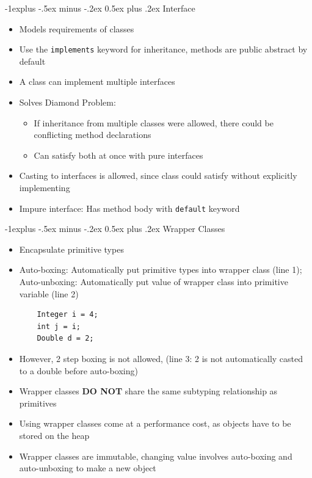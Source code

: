 \documentclass[10pt, landscape]{article}
\makeatletter
\renewcommand{\section}{\@startsection{section}{1}{0mm}%
                                {-1ex plus -.5ex minus -.2ex}%
                                {0.5ex plus .2ex}%
                                {\normalfont\large\bfseries}}
\renewcommand{\section}{\@startsection{section}{2}{0mm}%
                                {-1explus -.5ex minus -.2ex}%
                                {0.5ex plus .2ex}%
                                {\normalfont\normalsize\bfseries}}
\makeatother
\begin{document}
\begin{multicols*}{4}
\section{Interface}
\begin{itemize}
    \item Models requirements of classes
    \item Use the \verb|implements| keyword for inheritance, methods are public abstract by default
    \item A class can implement multiple interfaces
    \item Solves Diamond Problem:
    \begin{itemize}
        \item If inheritance from multiple classes were allowed, there could be conflicting method declarations
        \item Can satisfy both at once with pure interfaces
    \end {itemize}
    \item Casting to interfaces is allowed, since class could satisfy without explicitly implementing
    \item Impure interface: Has method body with \verb|default| keyword
\end{itemize}

\section{Wrapper Classes}
\begin{itemize}
    \item Encapsulate primitive types
    \item Auto-boxing: Automatically put primitive types into wrapper class (line 1); Auto-unboxing: Automatically put value of wrapper class into primitive variable (line 2)
    \begin{lstlisting}
    Integer i = 4;
    int j = i;
    Double d = 2;
    \end{lstlisting}
    \item However, 2 step boxing is not allowed, (line 3: 2 is not automatically casted to a double before auto-boxing)
    \item Wrapper classes \textbf{DO NOT} share the same subtyping relationship as primitives
    \item Using wrapper classes come at a performance cost, as objects have to be stored on the heap
    \item Wrapper classes are immutable, changing value involves auto-boxing and auto-unboxing to make a new object
\end{itemize}


\end{multicols*}
\end{document}
